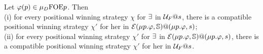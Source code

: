 \begin{proposition}\label{p:unfold=evalgame2}
Let %
$\varphi(p) \in \mu_{D}\mathrm{FOE}{p}$. Then 
\\(i) for every positional winning strategy $\chi$ for $\exists$ in $\mathcal{U}_F@s$,
there is a compatible positional winning strategy $\chi'$ for her in 
$\mathcal{E}(\mu p.\varphi,\mathbb{S})@(\mu p.\varphi,s)$;
\\(ii) for every positional winning strategy $\chi'$ for $\exists$ in 
$\mathcal{E}(\mu p.\varphi,\mathbb{S})@(\mu p.\varphi,s)$, there is a compatible  positional 
winning strategy $\chi'$ for her in $\mathcal{U}_F@s$.
\end{proposition}


